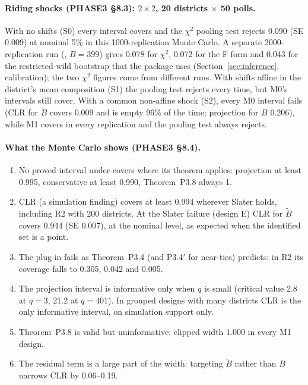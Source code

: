 \paragraph{Riding shocks (PHASE3 \S8.3): $2\times2$, 20 districts $\times$ 50 polls.}
With no shifts (S0) every interval covers and the $\chi^2$ pooling test rejects
0.090 (SE 0.009) at nominal 5\% in this 1000-replication Monte Carlo. A separate
2000-replication run (, $B=399$) gives 0.078 for
$\chi^2$, 0.072 for the F form and 0.043 for the restricted wild bootstrap that the
package uses (Section~\ref{sec:inference}, calibration); the two $\chi^2$ figures come
from different runs. With shifts affine in
the district's mean composition (S1) the pooling test rejects every time, but M0's
intervals still cover. With a common non-affine shock (S2), every M0 interval fails
(CLR for $\tilde B$ covers 0.009 and is empty 96\% of the time; projection for $B$
0.206), while M1 covers in every replication and the pooling test always rejects.

\paragraph{What the Monte Carlo shows (PHASE3 \S8.4).}
\begin{enumerate}[nosep]
\item No proved interval under-covers where its theorem applies: projection at least
0.995, conservative at least 0.990, Theorem~P3.8 always 1.
\item CLR (a simulation finding) covers at least 0.994 wherever Slater holds,
including R2 with 200 districts. At the Slater failure (design E) CLR for
$\tilde B$ covers 0.944 (SE 0.007), at the nominal level, as expected when the
identified set is a point.
\item The plug-in fails as Theorem~P3.4 (and P3.4$'$ for near-ties) predicts: in R2
its coverage falls to 0.305, 0.042 and 0.005.
\item The projection interval is informative only when $q$ is small (critical value
2.8 at $q=3$, 21.2 at $q=401$). In grouped designs with many districts CLR is the
only informative interval, on simulation support only.
\item Theorem~P3.8 is valid but uninformative: clipped width 1.000 in every M1 design.
\item The residual term is a large part of the width: targeting $\tilde B$ rather than
$B$ narrows CLR by 0.06--0.19.
\end{enumerate}

